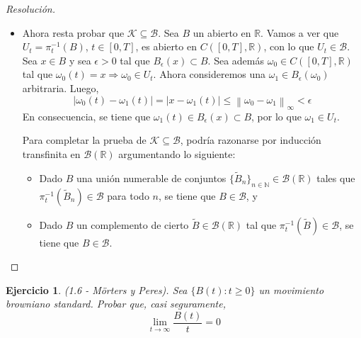 \documentclass[a4paper,11pt]{article}
\newcommand{\norm}[1]{\left\lVert#1\right\rVert}
\newcommand{\normi}[1]{\norm{#1}_{\infty}}
\newcommand{\CT}{\ensuremath{C([0,T], \mathbb{R})}}
\newcommand{\Bor}[1]{\ensuremath{\mathcal{B}(#1)}}
\newcommand{\Bola}[2]{\ensuremath{B_{#2}(#1)}}
\newtheorem*{ej}{Ejercicio}
\begin{document}
\begin{proof}[Resoluci\'on]
\begin{enumerate}[a)]
\begin{itemize}
            \item Ahora resta probar que $\mathcal{K} \subseteq \mathcal{B}$. Sea
            $B$ un abierto en $\mathbb{R}$. Vamos a ver que $U_t = \pi_t^{-1}(B)$,
            $t \in [0,T]$, es abierto en \CT, con lo que $U_t \in \mathcal{B}$. 
            Sea $x \in B$ y sea $\epsilon > 0$ tal que
            $\Bola{x}{\epsilon} \subset B$. Sea además $\omega_0 \in \CT$ tal que
            $\omega_0(t) = x \Rightarrow \omega_0 \in U_t$. Ahora consideremos
            una $\omega_1 \in \Bola{\omega_0}{\epsilon}$ arbitraria. Luego,
            $$|\omega_0(t) - \omega_1(t)| = |x - \omega_1(t)| \leq
              \normi{\omega_0 - \omega_1} < \epsilon$$
            En consecuencia, se tiene que $\omega_1(t) \in \Bola{x}{\epsilon} \subset B$,
            por lo que $\omega_1 \in U_t$.

            Para completar la prueba de $\mathcal{K} \subseteq \mathcal{B}$, podría
            razonarse por inducción transfinita en $\Bor{\mathbb{R}}$ argumentando
            lo siguiente:
                \begin{itemize}
                    \item Dado $B$ una unión numerable de conjuntos
                    $\{\tilde{B}_n\}_{n \in \mathbb{N}} \in \Bor{\mathbb{R}}$
                    tales que $\pi_t^{-1}(\tilde{B}_n) \in \mathcal{B}$ para todo $n$, se tiene que
                    $B \in \mathcal{B}$, y

                    \item Dado $B$ un complemento de cierto $\tilde{B} \in \Bor{\mathbb{R}}$ tal
                    que $\pi_t^{-1}(\tilde{B}) \in \mathcal{B}$, se tiene que
                    $B \in \mathcal{B}$.
                \end{itemize}
            
        \end{itemize}

\end{enumerate}

\end{proof}


\begin{ej}
    (1.6 - Mörters y Peres). Sea $\{B(t) : t \geq 0\}$ un movimiento browniano
    standard. Probar que, casi seguramente,
    $$\lim_{t \to \infty}{\frac{B(t)}{t}} = 0$$ 
\end{ej}
\end{document}
